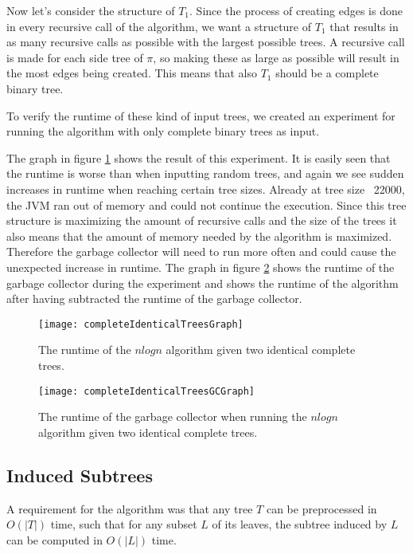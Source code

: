 Now let's consider the structure of $T_1$. Since the process of creating edges is done in every recursive call of the algorithm, we want a structure of $T_1$ that results in as many recursive calls as possible with the largest possible trees. A recursive call is made for each side tree of $\pi$, so making these as large as possible will result in the most edges being created. This means that also $T_1$ should be a complete binary tree.

To verify the runtime of these kind of input trees, we created an experiment for running the algorithm with only complete binary trees as input. 

The graph in figure \ref{completeIdenticalTreesGraph} shows the result of this experiment. It is easily seen that the runtime is worse than when inputting random trees, and again we see sudden increases in runtime when reaching certain tree sizes. Already at tree size ~22000, the JVM ran out of memory and could not continue the execution. Since this tree structure is maximizing the amount of recursive calls and the size of the trees it also means that the amount of memory needed by the algorithm is maximized. Therefore the garbage collector will need to run more often and could cause the unexpected increase in runtime. The graph in figure \ref{completeIdenticalTreesGCGraph} shows the runtime of the garbage collector during the experiment and  shows the runtime of the algorithm after having subtracted the runtime of the garbage collector. 

\begin{figure}
	\texttt{[image: completeIdenticalTreesGraph]}
	\caption{The runtime of the $nlogn$ algorithm given two identical complete trees.}
	\label{completeIdenticalTreesGraph}
\end{figure}

\begin{figure}
	\texttt{[image: completeIdenticalTreesGCGraph]}
	\caption{The runtime of the garbage collector when running the $nlogn$ algorithm given two identical complete trees.}
	\label{completeIdenticalTreesGCGraph}
\end{figure}


\subsection{Induced Subtrees}
A requirement for the algorithm was that any tree $T$ can be preprocessed in $O(|T|)$ time, such that for any subset $L$ of its leaves, the subtree induced by $L$ can be computed in $O(|L|)$ time.

